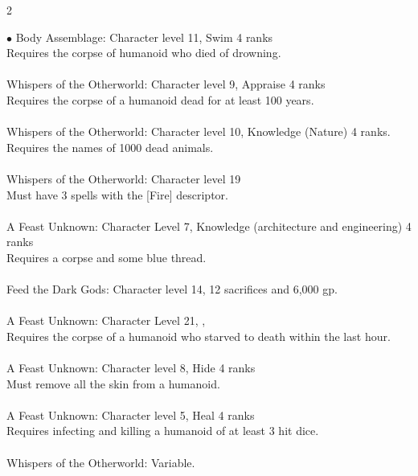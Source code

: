 \begin{multicols}{2}
\begin{small}
\begin{list}{$\bullet$}{\itemspace}
Body Assemblage: Character level 11, Swim 4 ranks\\
Requires the corpse of humanoid who died of drowning.\\
\\
Whispers of the Otherworld: Character level 9, Appraise 4 ranks\\
Requires the corpse of a humanoid dead for at least 100 years.\\
\\
Whispers of the Otherworld: Character level 10, Knowledge (Nature) 4 ranks.\\
Requires the names of 1000 dead animals.\\
\\
Whispers of the Otherworld: Character level 19\\
Must have 3 spells with the [Fire] descriptor.\\
\\
A Feast Unknown: Character Level 7, Knowledge (architecture and engineering) 4 ranks\\
Requires a corpse and some blue thread.\\
\\
Feed the Dark Gods: Character level 14, 12 sacrifices and 6,000 gp.\\
\\
A Feast Unknown: Character Level 21, , \\
Requires the corpse of a humanoid who starved to death within the last hour.\\
\\
A Feast Unknown: Character level 8, Hide 4 ranks\\
Must remove all the skin from a humanoid.\\
\\
A Feast Unknown: Character level 5, Heal 4 ranks\\
Requires infecting and killing a humanoid of at least 3 hit dice.\\
\\
Whispers of the Otherworld: Variable.\\

\end{list}
\end{small}
\end{multicols}
